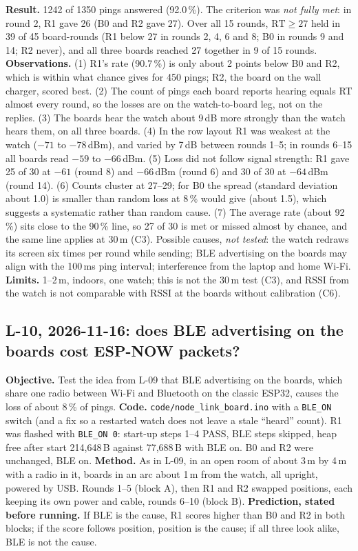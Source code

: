 \IfFileExists{IEEEtran.cls}{\documentclass[conference]{IEEEtran}}{\documentclass[10pt,twocolumn]{article}}
\begin{document}
\textbf{Result.} 1242 of 1350 pings answered (92.0\,\%). The criterion was \emph{not fully met}: in round 2, R1 gave 26 (B0 and R2 gave 27). Over all 15 rounds, $\mathrm{RT}\ge 27$ held in 39 of 45 board-rounds (R1 below 27 in rounds 2, 4, 6 and 8; B0 in rounds 9 and 14; R2 never), and all three boards reached 27 together in 9 of 15 rounds. \textbf{Observations.} (1) R1's rate (90.7\,\%) is only about 2 points below B0 and R2, which is within what chance gives for 450 pings; R2, the board on the wall charger, scored best. (2) The count of pings each board reports hearing equals RT almost every round, so the losses are on the watch-to-board leg, not on the replies. (3) The boards hear the watch about 9\,dB more strongly than the watch hears them, on all three boards. (4) In the row layout R1 was weakest at the watch ($-71$ to $-78$\,dBm), and varied by 7\,dB between rounds 1--5; in rounds 6--15 all boards read $-59$ to $-66$\,dBm. (5) Loss did not follow signal strength: R1 gave 25 of 30 at $-61$ (round 8) and $-66$\,dBm (round 6) and 30 of 30 at $-64$\,dBm (round 14). (6) Counts cluster at 27--29; for B0 the spread (standard deviation about 1.0) is smaller than random loss at 8\,\% would give (about 1.5), which suggests a systematic rather than random cause. (7) The average rate (about 92\,\%) sits close to the 90\,\% line, so 27 of 30 is met or missed almost by chance, and the same line applies at 30\,m (C3). Possible causes, \emph{not tested}: the watch redraws its screen six times per round while sending; BLE advertising on the boards may align with the 100\,ms ping interval; interference from the laptop and home Wi-Fi. \textbf{Limits.} 1--2\,m, indoors, one watch; this is not the 30\,m test (C3), and RSSI from the watch is not comparable with RSSI at the boards without calibration (C6).

\subsection*{L-10, 2026-11-16: does BLE advertising on the boards cost ESP-NOW packets?}
\textbf{Objective.} Test the idea from L-09 that BLE advertising on the boards, which share one radio between Wi-Fi and Bluetooth on the classic ESP32, causes the loss of about 8\,\% of pings. \textbf{Code.} \texttt{code/node\_link\_board.ino} with a \texttt{BLE\_ON} switch (and a fix so a restarted watch does not leave a stale ``heard'' count). R1 was flashed with \texttt{BLE\_ON 0}: start-up steps 1--4 PASS, BLE steps skipped, heap free after start 214{,}648\,B against 77{,}688\,B with BLE on. B0 and R2 were unchanged, BLE on. \textbf{Method.} As in L-09, in an open room of about 3\,m by 4\,m with a radio in it, boards in an arc about 1\,m from the watch, all upright, powered by USB. Rounds 1--5 (block A), then R1 and R2 swapped positions, each keeping its own power and cable, rounds 6--10 (block B). \textbf{Prediction, stated before running.} If BLE is the cause, R1 scores higher than B0 and R2 in both blocks; if the score follows position, position is the cause; if all three look alike, BLE is not the cause.
\end{document}
